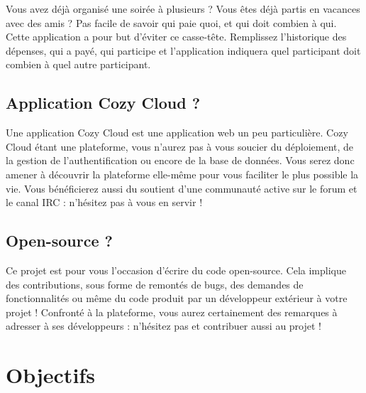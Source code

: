 \documentclass{42-fr}
\begin{document}
		Vous avez d\'ej\`a organisé une soir\'ee \`a plusieurs ? Vous \^etes d\'ej\`a partis en
		vacances avec des amis ? Pas facile de savoir qui paie quoi, et qui doit
		combien \`a qui. Cette application a pour but d'\'eviter ce casse-t\^ete. Remplissez
		l'historique des d\'epenses, qui a pay\'e, qui participe et l'application
		indiquera quel participant doit combien \`a quel autre participant.

	\section{Application Cozy Cloud ?}

		Une application Cozy Cloud est une application web un peu particuli\`ere.
		Cozy Cloud \'etant une plateforme, vous n'aurez pas \`a vous soucier du
		d\'eploiement, de la gestion de l'authentification ou encore de la base de
		donn\'ees. Vous serez donc amener \`a d\'ecouvrir la plateforme elle-m\^eme pour
		vous faciliter le plus possible la vie.\newline
		Vous b\'en\'eficierez aussi du soutient d'une communaut\'e active sur le 
		forum et le canal IRC : n'h\'esitez pas \`a vous en servir !


	\section{Open-source ?}

		Ce projet est pour vous l'occasion d'\'ecrire du code open-source.
		Cela implique des contributions, sous forme de remont\'es de bugs, des
		demandes de fonctionnalit\'es ou m\^eme du code produit par un d\'eveloppeur
		ext\'erieur \`a votre projet !
		Confront\'e \`a la plateforme, vous aurez certainement des remarques \`a
		adresser \`a ses d\'eveloppeurs : n'h\'esitez pas et contribuer aussi au projet !



\chapter{Objectifs}
\end{document}
